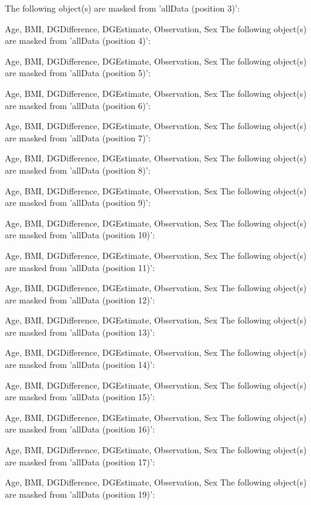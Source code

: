 \begin{Schunk}
\begin{Soutput}
The following object(s) are masked from 'allData (position 3)':

    Age, BMI, DGDifference, DGEstimate, Observation, Sex
The following object(s) are masked from 'allData (position 4)':

    Age, BMI, DGDifference, DGEstimate, Observation, Sex
The following object(s) are masked from 'allData (position 5)':

    Age, BMI, DGDifference, DGEstimate, Observation, Sex
The following object(s) are masked from 'allData (position 6)':

    Age, BMI, DGDifference, DGEstimate, Observation, Sex
The following object(s) are masked from 'allData (position 7)':

    Age, BMI, DGDifference, DGEstimate, Observation, Sex
The following object(s) are masked from 'allData (position 8)':

    Age, BMI, DGDifference, DGEstimate, Observation, Sex
The following object(s) are masked from 'allData (position 9)':

    Age, BMI, DGDifference, DGEstimate, Observation, Sex
The following object(s) are masked from 'allData (position 10)':

    Age, BMI, DGDifference, DGEstimate, Observation, Sex
The following object(s) are masked from 'allData (position 11)':

    Age, BMI, DGDifference, DGEstimate, Observation, Sex
The following object(s) are masked from 'allData (position 12)':

    Age, BMI, DGDifference, DGEstimate, Observation, Sex
The following object(s) are masked from 'allData (position 13)':

    Age, BMI, DGDifference, DGEstimate, Observation, Sex
The following object(s) are masked from 'allData (position 14)':

    Age, BMI, DGDifference, DGEstimate, Observation, Sex
The following object(s) are masked from 'allData (position 15)':

    Age, BMI, DGDifference, DGEstimate, Observation, Sex
The following object(s) are masked from 'allData (position 16)':

    Age, BMI, DGDifference, DGEstimate, Observation, Sex
The following object(s) are masked from 'allData (position 17)':

    Age, BMI, DGDifference, DGEstimate, Observation, Sex
The following object(s) are masked from 'allData (position 19)':


\end{Soutput}
\end{Schunk}

